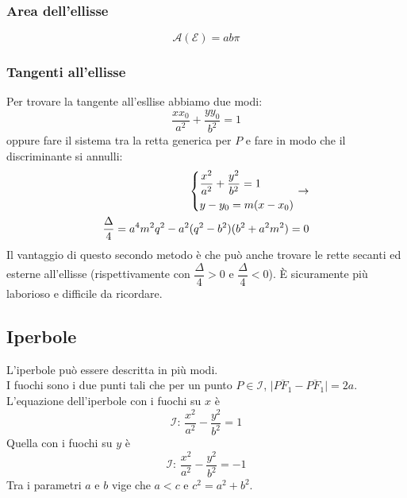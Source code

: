 \subsubsection{Area dell'ellisse}
\begin{equation*}
  \mathscr{A}(\mathscr{E}) = ab\pi
\end{equation*}

\subsubsection{Tangenti all'ellisse}
Per trovare la tangente all'esllise abbiamo due modi:
\begin{equation*}
  \frac{xx_0}{a^2}+\frac{yy_0}{b^2}=1
\end{equation*}
oppure fare il sistema tra la retta generica per $P$ e fare in modo che il discriminante si annulli:
\begin{align*}
  \begin{dcases}
    \frac{x^2}{a^2}+\frac{y^2}{b^2}=1\\
    y-y_0=m(x-x_0)
  \end{dcases}\rightarrow\\ \frac{\Delta}{4}=a^4m^2q^2-a^2(q^2-b^2)(b^2+a^2m^2) = 0
\end{align*}
Il vantaggio di questo secondo metodo è che può anche trovare le rette secanti ed esterne all'ellisse
(rispettivamente con $\dfrac{\Delta}{4}>0$ e $\dfrac{\Delta}{4}<0$). È sicuramente più laborioso e
difficile da ricordare.

\subsection{Iperbole}
\begin{center}
\end{center}
L'iperbole può essere descritta in più modi.\\
I fuochi sono i due punti tali che per un punto $P\in\mathscr{I}$, 
$\lvert \overline{PF_1}-\overline{PF_1}\rvert=2a$.\\
L'equazione dell'iperbole con i fuochi su $x$ è
\begin{equation*}
  \mathscr{I}:\,\frac{x^2}{a^2}-\frac{y^2}{b^2}=1
\end{equation*}
Quella con i fuochi su $y$ è
\begin{equation*}
  \mathscr{I}:\,\frac{x^2}{a^2}-\frac{y^2}{b^2}=-1
\end{equation*}
Tra i parametri $a$ e $b$ vige che $a < c$ e $c^2 = a^2+b^2$.

